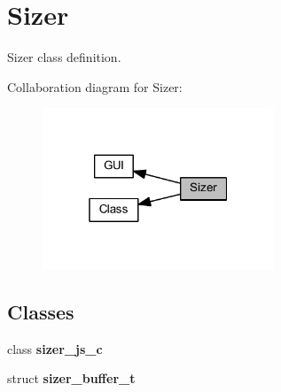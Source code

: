 \section{Sizer}
\label{group___sizer}


Sizer class definition.  


Collaboration diagram for Sizer\+:
\nopagebreak
\begin{figure}[H]
\begin{center}
\leavevmode
\includegraphics[width=196pt]{group___sizer}
\end{center}
\end{figure}
\subsection*{Classes}
\begin{DoxyCompactItemize}
\item 
class \textbf{ sizer\+\_\+js\+\_\+c}
\item 
struct \textbf{ sizer\+\_\+buffer\+\_\+t}
\end{DoxyCompactItemize}
